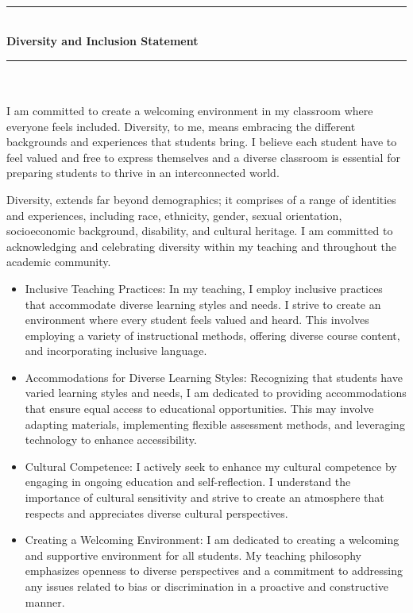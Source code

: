 \newpage
  \thispagestyle{empty}
 \phantom \quad \\
\hrule \phantom \quad  \vspace*{1\baselineskip}  \\
{\bf Diversity and Inclusion Statement}
 \vspace*{1\baselineskip}  \hrule \phantom \quad \\
\vspace*{3\baselineskip} \phantom \quad \\
 I am committed to create a welcoming environment in my classroom where everyone feels included. Diversity, to me, means embracing the different backgrounds and experiences that students bring. I believe each student have to feel valued and free to express themselves and  a diverse classroom is essential for preparing students to thrive in an interconnected world. 
 
 Diversity, extends far beyond demographics; it comprises of a range of identities and experiences, including race, ethnicity, gender, sexual orientation, socioeconomic background, disability, and cultural heritage. I am committed to acknowledging and celebrating diversity within my teaching and throughout the academic community.
 \begin{itemize}
\item{ Inclusive Teaching Practices:}
In my teaching, I employ inclusive practices that accommodate diverse learning styles and needs. I strive to create an environment where every student feels valued and heard. This involves employing a variety of instructional methods, offering diverse course content, and incorporating inclusive language.
\item{ Accommodations for Diverse Learning Styles:}
Recognizing that students have varied learning styles and needs, I am dedicated to providing accommodations that ensure equal access to educational opportunities. This may involve adapting materials, implementing flexible assessment methods, and leveraging technology to enhance accessibility.
\item{ Cultural Competence:}
I actively seek to enhance my cultural competence by engaging in ongoing education and self-reflection. I understand the importance of cultural sensitivity and strive to create an atmosphere that respects and appreciates diverse cultural perspectives.
 \item{ Creating a Welcoming Environment:}
I am dedicated to creating a welcoming and supportive environment for all students. My teaching philosophy emphasizes openness to diverse perspectives and a commitment to addressing any issues related to bias or discrimination in a proactive and constructive manner.
  \end{itemize}
 
